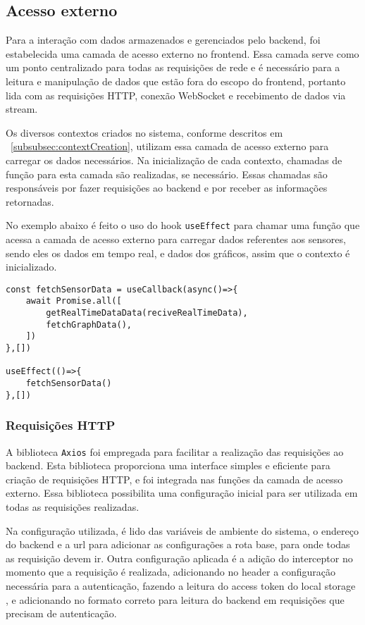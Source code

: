 \subsection{Acesso externo}\label{subsec:api_access}
Para a interação com dados armazenados e gerenciados pelo backend, foi estabelecida uma camada de acesso externo no frontend. Essa camada serve como um ponto centralizado para todas as requisições de rede e é necessário para a leitura e manipulação de dados que estão fora do escopo do frontend, portanto lida com as requisições HTTP, conexão WebSocket e recebimento de dados via stream.

Os diversos contextos criados no sistema, conforme descritos em ~\ref{subsubsec:contextCreation}, utilizam essa camada de acesso externo para carregar os dados necessários. Na inicialização de cada contexto, chamadas de função para esta camada são realizadas, se necessário. Essas chamadas são responsáveis por fazer requisições ao backend e por receber as informações retornadas.

No exemplo abaixo é feito o uso do hook \texttt{useEffect} \cite{reactUseEffect} para chamar uma função que acessa a camada de acesso externo para carregar dados referentes aos sensores, sendo eles os dados em tempo real, e dados dos gráficos, assim que o contexto é inicializado.

\begin{verbatim}
const fetchSensorData = useCallback(async()=>{
    await Promise.all([
        getRealTimeDataData(reciveRealTimeData),
        fetchGraphData(),
    ])
},[])

useEffect(()=>{
    fetchSensorData()
},[])
\end{verbatim}


\subsubsection{Requisições HTTP}\label{subsubsec:httpRequest}
A biblioteca \texttt{Axios} \cite{axiosIntro} foi empregada para facilitar a realização das requisições ao backend. Esta biblioteca proporciona uma interface simples e eficiente para criação de requisições \gls{HTTP}, e foi integrada nas funções da camada de acesso externo. Essa biblioteca possibilita uma configuração inicial para ser utilizada em todas as requisições realizadas.

Na configuração utilizada, é lido das variáveis de ambiente do sistema, o endereço do backend e a url para adicionar as configurações a rota base, para onde todas as requisição devem ir. Outra configuração aplicada é a adição do interceptor \cite{axiosInterceptors} no momento que a requisição é realizada, adicionando no header a configuração necessária para a autenticação, fazendo a leitura do access token do local storage \cite{mdnLocalStorage}, e adicionando no formato correto para leitura do backend em requisições que precisam de autenticação.

